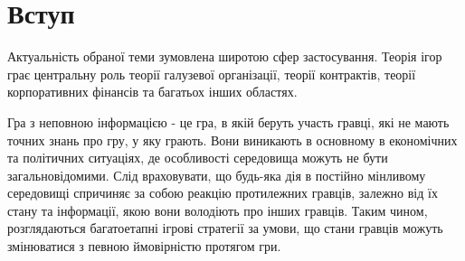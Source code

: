 \chapter*{Вступ}


Актуальність обраної теми зумовлена широтою сфер застосування. 
Теорія ігор грає центральну роль теорії галузевої організації, теорії контрактів, теорії корпоративних фінансів та багатьох інших областях. 

Гра з неповною інформацією - це гра, в якій беруть участь гравці, які
не мають точних знань про гру, у яку грають. Вони виникають в основному в
економічних та політичних ситуаціях, де особливості середовища можуть не бути загальновідомими. Слід враховувати, що будь-яка дія в
постійно мінливому середовищі спричиняє за собою реакцію протилежних гравців, залежно від їх стану та інформації, якою вони володіють про інших гравців. Таким чином, розглядаються багатоетапні ігрові стратегії
за умови, що стани гравців можуть змінюватися з певною ймовірністю протягом
гри.